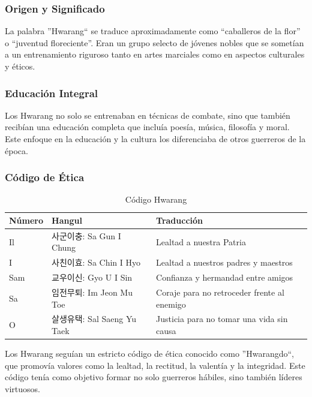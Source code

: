 \subsubsection{Origen y Significado}

La palabra ''Hwarang`` se traduce aproximadamente como ``caballeros de la flor'' o ``juventud floreciente''. Eran un grupo selecto de jóvenes nobles que se sometían a un entrenamiento riguroso tanto en artes marciales como en aspectos culturales y éticos.

\subsubsection{Educación Integral}

Los Hwarang no solo se entrenaban en técnicas de combate, sino que también recibían una educación completa que incluía poesía, música, filosofía y moral. Este enfoque en la educación y la cultura los diferenciaba de otros guerreros de la época.

\subsubsection{Código de Ética}

\begin{table}[t]
	\caption{Código Hwarang}
	\begin{center}
		\begin{tabular}{ | m{2cm} | m{5cm} | m{5cm} | }
			\hline Número & Hangul & Traducción \\ \hline
			Il & 사군이충: Sa Gun I Chung & Lealtad a nuestra Patria \\
			I & 사친이효: Sa Chin I Hyo & Lealtad a nuestros padres y maestros \\
			Sam & 교우이신: Gyo U I Sin & Confianza y hermandad entre amigos\\
			Sa & 임전무퇴: Im Jeon Mu Toe & Coraje para no retroceder frente al enemigo\\
			O & 살생유택: Sal Saeng Yu Taek & Justicia para no tomar una vida sin causa\\ \hline
		\end{tabular}
	\end{center}
\end{table}


Los Hwarang seguían un estricto código de ética conocido como ''Hwarangdo\textregistered``, que promovía valores como la lealtad, la rectitud, la valentía y la integridad. Este código tenía como objetivo formar no solo guerreros hábiles, sino también líderes virtuosos.

